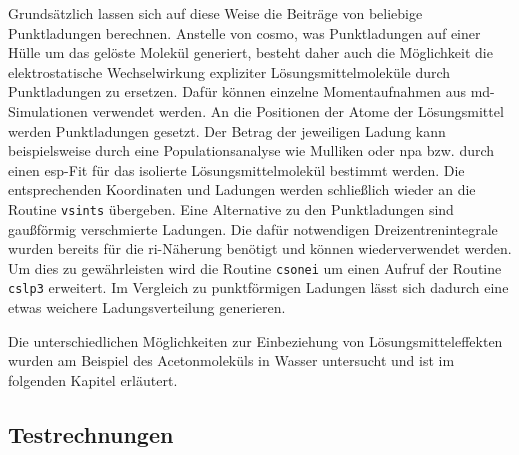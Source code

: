 Grundsätzlich lassen sich auf diese Weise die Beiträge von beliebige Punktladungen berechnen. Anstelle von \ac{cosmo}, was Punktladungen auf einer Hülle um das gelöste Molekül generiert, besteht daher auch die Möglichkeit die elektrostatische Wechselwirkung expliziter Lösungsmittelmoleküle durch Punktladungen zu ersetzen. Dafür können einzelne Momentaufnahmen aus \ac{md}-Simulationen verwendet werden. An die Positionen der Atome der Lösungsmittel werden Punktladungen gesetzt. Der Betrag der jeweiligen Ladung kann beispielsweise durch eine Populationsanalyse wie Mulliken\supercite{mulliken1955electronic} oder \ac{npa}\supercite{reed1985natural} bzw. durch einen \ac{esp}-Fit\supercite{singh1984approach} für das isolierte Lösungsmittelmolekül bestimmt werden. Die entsprechenden Koordinaten und Ladungen werden schließlich wieder an die Routine \texttt{vsints} übergeben. Eine Alternative zu den Punktladungen sind gaußförmig verschmierte Ladungen. Die dafür notwendigen Dreizentrenintegrale wurden bereits für die \ac{ri}-Näherung benötigt und können wiederverwendet werden. Um dies zu gewährleisten wird die Routine \texttt{csonei} um einen Aufruf der Routine \texttt{cslp3} erweitert. Im Vergleich zu punktförmigen Ladungen lässt sich dadurch eine etwas weichere Ladungsverteilung generieren. 

Die unterschiedlichen Möglichkeiten zur Einbeziehung von Lösungsmitteleffekten wurden am Beispiel des Acetonmoleküls in Wasser untersucht und ist im folgenden Kapitel erläutert.
	
	\subsection{Testrechnungen}\label{lömitest}
	
